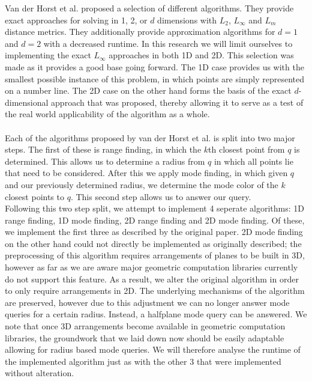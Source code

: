 \documentclass{article}
\begin{document}
{    Van der Horst et al. proposed a selection of different algorithms. They provide exact approaches for solving in 1, 2, or $d$ dimensions with $L_2$, $L_\infty$ and $L_m$ distance metrics. They additionally provide approximation algorithms for $d=1$ and $d=2$ with a decreased runtime. In this research we will limit ourselves to implementing the exact $L_\infty$ approaches in both 1D and 2D. This selection was made as it provides a good base going forward. The 1D case provides us with the smallest possible instance of this problem, in which points are simply represented on a number line. The 2D case on the other hand forms the basis of the exact $d$-dimensional approach that was proposed, thereby allowing it to serve as a test of the real world applicability of the algorithm as a whole. \\\\
    Each of the algorithms proposed by van der Horst et al. is split into two major steps. The first of these is range finding, in which the $k$th closest point from $q$ is determined. This allows us to determine a radius from $q$ in which all points lie that need to be considered. After this we apply mode finding, in which given $q$ and our previously determined radius, we determine the mode color of the $k$ closest points to $q$. This second step allows us to answer our query. \\
    Following this two step split, we attempt to implement 4 seperate algorithms: 1D range finding, 1D mode finding, 2D range finding and 2D mode finding. Of these, we implement the first three as described by the original paper. 2D mode finding on the other hand could not directly be implemented as originally described; the preprocessing of this algorithm requires arrangements of planes to be built in 3D, however as far as we are aware major geometric computation libraries currently do not support this feature. As a result, we alter the original algorithm in order to only require arrangements in 2D. The underlying mechanisms of the algorithm are preserved, however due to this adjustment we can no longer answer mode queries for a certain radius. Instead, a halfplane mode query can be answered. We note that once 3D arrangements become available in geometric computation libraries, the groundwork that we laid down now should be easily adaptable allowing for radius based mode queries. We will therefore analyse the runtime of the implemented algorithm just as with the other 3 that were implemented without alteration. \\\\
}
\end{document}
